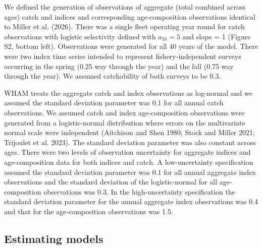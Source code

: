 \documentclass[
  12pt,
]{article}
\begin{document}
We defined the generation of observations of aggregate (total combined
across ages) catch and indices and corresponding age-composition
observations identical to Miller et al. (2026). There was a single fleet
operating year round for catch observations with logistic selectivity
defined with \(a_{50} = 5\) and slope = 1 (Figure S2, bottom left).
Observations were generated for all 40 years of the model. There were
two index time series intended to represent fishery-independent surveys
occurring in the spring (0.25 way through the year) and the fall (0.75
way through the year). We assumed catchability of both surveys to be
0.3.

WHAM treats the aggregate catch and index observations as log-normal and
we assumed the standard deviation parameter was 0.1 for all annual catch
observations. We assumed catch and index age-composition observations
were generated from a logistic-normal distribution where errors on the
multivariate normal scale were independent (Aitchison and Shen 1980;
Stock and Miller 2021; Trijoulet et al. 2023). The standard deviation
parameter was also constant across ages. There were two levels of
observation uncertainty for aggregate indices and age-composition data
for both indices and catch. A low-uncertainty specification assumed the
standard deviation parameter was 0.1 for all annual aggregate index
observations and the standard deviation of the logistic-normal for all
age-composition observations was 0.3. In the high-uncertainty
specification the standard deviation parameter for the annual aggregate
index observations was 0.4 and that for the age-composition observations
was 1.5.

\subsection*{Estimating models}\label{estimating-models}
\end{document}
